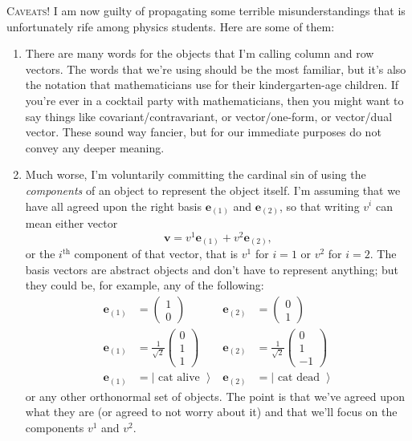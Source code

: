 \documentclass[12pt]{article}
\renewcommand{\vec}[1]{\mathbf{#1}} %
\begin{document}
\begin{framed}
\textsc{Caveats!} I am now guilty of propagating some terrible misunderstandings that is unfortunately rife among physics students. Here are some of them:
\begin{enumerate}
	\item There are many words for the objects that I'm calling column and row vectors. The words that we're using should be the most familiar, but it's also the notation that mathematicians use for their kindergarten-age children. If you're ever in a cocktail party with mathematicians, then you might want to say things like covariant/contravariant, or vector/one-form, or vector/dual vector. These sound way fancier, but for our immediate purposes do not convey any deeper meaning. 
	\item Much worse, I'm voluntarily committing the cardinal sin of using the \emph{components} of an object to represent the object itself. I'm assuming that we have all agreed upon the right basis $\vec{e}_{(1)}$ and $\vec{e}_{(2)}$, so that writing $v^i$ can mean either vector $$\vec{v} = v^1 \vec{e}_{(1)} + v^2 \vec{e}_{(2)},$$ or the $i^\text{th}$ component of that vector, that is $v^1$ for $i=1$ or $v^2$ for $i=2$. The basis vectors are abstract objects and don't have to represent anything; but they could be, for example, any of the following:
\begin{align}
	\vec{e}_{(1)} & = \begin{pmatrix}1\\0\end{pmatrix}
	&
	\vec{e}_{(2)} & = \begin{pmatrix}0\\1\end{pmatrix}
	\\
	\vec{e}_{(1)} & = \frac{1}{\sqrt{2}}\begin{pmatrix}0\\1\\1\end{pmatrix}
	&
	\vec{e}_{(2)} & = \frac{1}{\sqrt{2}}\begin{pmatrix}0\\1\\-1\end{pmatrix}
	\\
	\vec{e}_{(1)} & = \left|\text{ cat alive } \right\rangle
	&
	\vec{e}_{(2)} & = \left|\text{ cat dead } \right\rangle
\end{align}
or any other orthonormal set of objects. The point is that we've agreed upon what they are (or agreed to not worry about it) and that we'll focus on the components $v^1$ and $v^2$.
\end{enumerate}
\end{framed}
\end{document}
